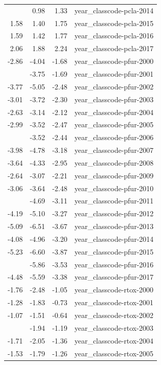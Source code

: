 \documentclass[]{article}
\begin{document}
\begin{longtable}[t]{rrrl}
\addlinespace
1.15 & 0.98 & 1.33 & year\_classcode-pcla-2014\\
1.58 & 1.40 & 1.75 & year\_classcode-pcla-2015\\
1.59 & 1.42 & 1.77 & year\_classcode-pcla-2016\\
2.06 & 1.88 & 2.24 & year\_classcode-pcla-2017\\
-2.86 & -4.04 & -1.68 & year\_classcode-pfur-2000\\
\addlinespace
-2.72 & -3.75 & -1.69 & year\_classcode-pfur-2001\\
-3.77 & -5.05 & -2.48 & year\_classcode-pfur-2002\\
-3.01 & -3.72 & -2.30 & year\_classcode-pfur-2003\\
-2.63 & -3.14 & -2.12 & year\_classcode-pfur-2004\\
-2.99 & -3.52 & -2.47 & year\_classcode-pfur-2005\\
\addlinespace
-2.98 & -3.52 & -2.44 & year\_classcode-pfur-2006\\
-3.98 & -4.78 & -3.18 & year\_classcode-pfur-2007\\
-3.64 & -4.33 & -2.95 & year\_classcode-pfur-2008\\
-2.64 & -3.07 & -2.21 & year\_classcode-pfur-2009\\
-3.06 & -3.64 & -2.48 & year\_classcode-pfur-2010\\
\addlinespace
-3.90 & -4.69 & -3.11 & year\_classcode-pfur-2011\\
-4.19 & -5.10 & -3.27 & year\_classcode-pfur-2012\\
-5.09 & -6.51 & -3.67 & year\_classcode-pfur-2013\\
-4.08 & -4.96 & -3.20 & year\_classcode-pfur-2014\\
-5.23 & -6.60 & -3.87 & year\_classcode-pfur-2015\\
\addlinespace
-4.70 & -5.86 & -3.53 & year\_classcode-pfur-2016\\
-4.48 & -5.59 & -3.38 & year\_classcode-pfur-2017\\
-1.76 & -2.48 & -1.05 & year\_classcode-rtox-2000\\
-1.28 & -1.83 & -0.73 & year\_classcode-rtox-2001\\
-1.07 & -1.51 & -0.64 & year\_classcode-rtox-2002\\
\addlinespace
-1.57 & -1.94 & -1.19 & year\_classcode-rtox-2003\\
-1.71 & -2.05 & -1.36 & year\_classcode-rtox-2004\\
-1.53 & -1.79 & -1.26 & year\_classcode-rtox-2005\\

\end{longtable}
\end{document}
